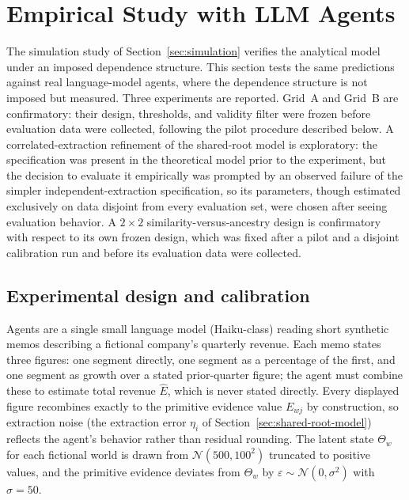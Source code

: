 \section{Empirical Study with LLM Agents}
\label{sec:empirical-study}

The simulation study of Section~\ref{sec:simulation} verifies the
analytical model under an imposed dependence structure. This section tests
the same predictions against real language-model agents, where the
dependence structure is not imposed but measured. Three experiments are
reported. Grid~A and Grid~B are confirmatory: their design, thresholds,
and validity filter were frozen before evaluation data were collected,
following the pilot procedure described below. A correlated-extraction
refinement of the shared-root model is exploratory: the specification was
present in the theoretical model prior to the experiment, but the decision
to evaluate it empirically was prompted by an observed failure of the
simpler independent-extraction specification, so its parameters, though
estimated exclusively on data disjoint from every evaluation set, were
chosen after seeing evaluation behavior. A $2\times2$
similarity-versus-ancestry design is confirmatory with respect to its own
frozen design, which was fixed after a pilot and a disjoint calibration
run and before its evaluation data were collected.

\subsection{Experimental design and calibration}
\label{sec:emp-design}

Agents are a single small language model (Haiku-class) reading short
synthetic memos describing a fictional company's quarterly revenue. Each
memo states three figures: one segment directly, one segment as a
percentage of the first, and one segment as growth over a stated
prior-quarter figure; the agent must combine these to estimate total
revenue $\hat E$, which is never stated directly. Every displayed figure
recombines exactly to the primitive evidence value $E_{wj}$ by
construction, so extraction noise (the extraction error $\eta_i$ of
Section~\ref{sec:shared-root-model}) reflects the agent's behavior rather
than residual rounding. The latent state $\Theta_w$ for each fictional
world is drawn from $\mathcal N(500,100^2)$ truncated to positive values,
and the primitive evidence deviates from $\Theta_w$ by
$\varepsilon\sim\mathcal N(0,\sigma^2)$ with $\sigma=50$.

